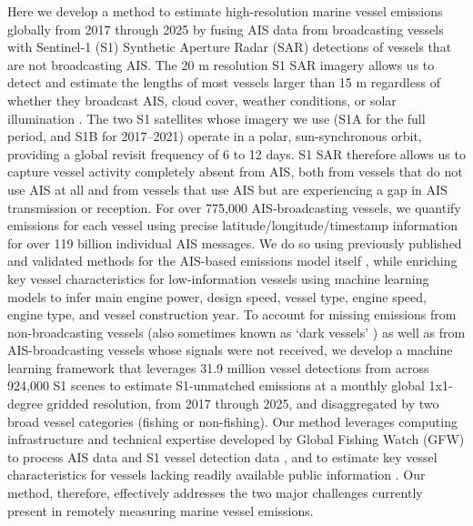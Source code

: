 \documentclass[lineno,pdflatex,sn-nature]{sn-jnl}
\begin{document}
Here we develop a method to estimate high-resolution marine vessel emissions globally from 2017 through 2025 by fusing AIS data from broadcasting vessels with Sentinel-1 (S1) Synthetic Aperture Radar (SAR) detections of vessels that are not broadcasting AIS. The 20 m resolution S1 SAR imagery allows us to detect and estimate the lengths of most vessels larger than 15 m regardless of whether they broadcast AIS, cloud cover, weather conditions, or solar illumination \cite{paolo2024satellite}. The two S1 satellites whose imagery we use (S1A for the full period, and S1B for 2017--2021) operate in a polar, sun-synchronous orbit, providing a global revisit frequency of 6 to 12 days. S1 SAR therefore allows us to capture vessel activity completely absent from AIS, both from vessels that do not use AIS at all and from vessels that use AIS but are experiencing a gap in AIS transmission or reception. For over 775,000 AIS-broadcasting vessels, we quantify emissions for each vessel using precise latitude/longitude/timestamp information for over 119 billion individual AIS messages. We do so using previously published and validated methods for the AIS-based emissions model itself \cite{olmer2017greenhouse, fourth2020greenhouse}, while enriching key vessel characteristics for low-information vessels using machine learning models to infer main engine power, design speed, vessel type, engine speed, engine type, and vessel construction year. To account for missing emissions from non-broadcasting vessels (also sometimes known as `dark vessels' \cite{rowlands2019satellite}) as well as from AIS-broadcasting vessels whose signals were not received, we develop a machine learning framework that leverages 31.9 million vessel detections from across 924,000 S1 scenes to estimate S1-unmatched emissions at a monthly global 1x1-degree gridded resolution, from 2017 through 2025, and disaggregated by two broad vessel categories (fishing or non-fishing). Our method leverages computing infrastructure and technical expertise developed by Global Fishing Watch (GFW) \cite{gfw_website} 
 to process AIS data \cite{kroodsma2018tracking} and S1 vessel detection data \cite{paolo2024satellite}, and to estimate key vessel characteristics for vessels lacking readily available public information \cite{park2023tracking}. Our method, therefore, effectively addresses the two major challenges currently present in remotely measuring marine vessel emissions.
\end{document}
